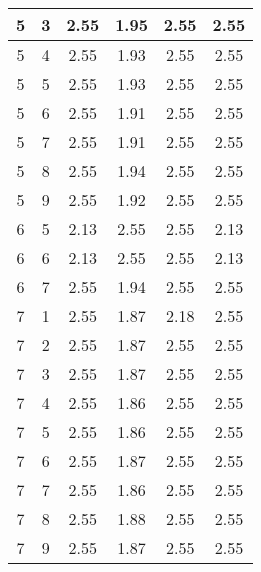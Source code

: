 \begin{longtable}{|c|c||c||c|c||c|}
	5 & 3 & 2.55 & 1.95 & 2.55 & 2.55 \\ \hline
	5 & 4 & 2.55 & 1.93 & 2.55 & 2.55 \\ \hline
	5 & 5 & 2.55 & 1.93 & 2.55 & 2.55 \\ \hline
	5 & 6 & 2.55 & 1.91 & 2.55 & 2.55 \\ \hline
	5 & 7 & 2.55 & 1.91 & 2.55 & 2.55 \\ \hline
	5 & 8 & 2.55 & 1.94 & 2.55 & 2.55 \\ \hline
	5 & 9 & 2.55 & 1.92 & 2.55 & 2.55 \\ \hline
	6 & 5 & 2.13 & 2.55 & 2.55 & 2.13 \\ \hline
	6 & 6 & 2.13 & 2.55 & 2.55 & 2.13 \\ \hline
	6 & 7 & 2.55 & 1.94 & 2.55 & 2.55 \\ \hline
	7 & 1 & 2.55 & 1.87 & 2.18 & 2.55 \\ \hline
	7 & 2 & 2.55 & 1.87 & 2.55 & 2.55 \\ \hline
	7 & 3 & 2.55 & 1.87 & 2.55 & 2.55 \\ \hline
	7 & 4 & 2.55 & 1.86 & 2.55 & 2.55 \\ \hline
	7 & 5 & 2.55 & 1.86 & 2.55 & 2.55 \\ \hline
	7 & 6 & 2.55 & 1.87 & 2.55 & 2.55 \\ \hline
	7 & 7 & 2.55 & 1.86 & 2.55 & 2.55 \\ \hline
	7 & 8 & 2.55 & 1.88 & 2.55 & 2.55 \\ \hline
	7 & 9 & 2.55 & 1.87 & 2.55 & 2.55 \\ \hline
\end{longtable}
\clearpage{}
